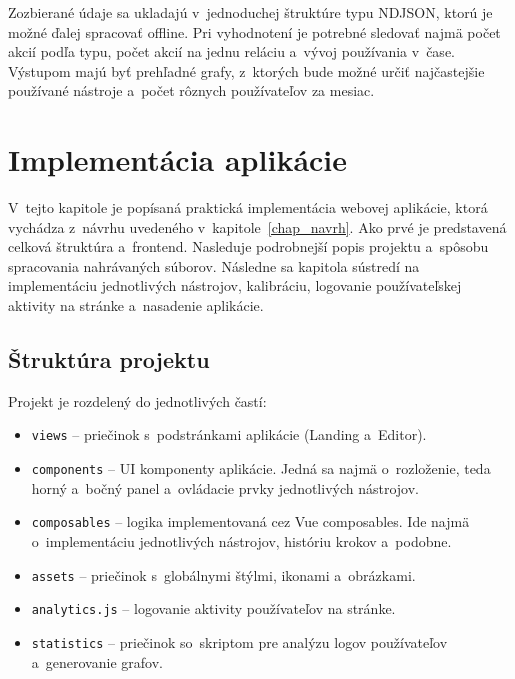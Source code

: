 Zozbierané údaje sa ukladajú v~jednoduchej štruktúre typu NDJSON, ktorú je možné ďalej spracovať offline. Pri vyhodnotení je potrebné sledovať najmä počet akcií podľa typu, počet akcií na jednu reláciu a~vývoj používania v~čase. Výstupom majú byť prehľadné grafy, z~ktorých bude možné určiť najčastejšie používané nástroje a~počet rôznych používateľov za mesiac.

\chapter{Implementácia aplikácie}
\label{chap_implementacia}

V~tejto kapitole je popísaná praktická implementácia webovej aplikácie, ktorá vychádza z~návrhu uvedeného v~kapitole~\ref{chap_navrh}. Ako prvé je predstavená celková štruktúra a~frontend. Nasleduje podrobnejší popis projektu a~spôsobu spracovania nahrávaných súborov. Následne sa kapitola sústredí na implementáciu jednotlivých nástrojov, kalibráciu, logovanie používateľskej aktivity na stránke a~nasadenie aplikácie. 

\section{Štruktúra projektu}

Projekt je rozdelený do jednotlivých častí:
\begin{itemize}
    \item{\texttt{views} -- priečinok s~podstránkami aplikácie (Landing a~Editor).}
    \item{\texttt{components} -- UI komponenty aplikácie. Jedná sa najmä o~rozloženie, teda horný a~bočný panel a~ovládacie prvky jednotlivých nástrojov.}
    \item{\texttt{composables} -- logika implementovaná cez Vue composables. Ide najmä o~implementáciu jednotlivých nástrojov, históriu krokov a~podobne.}
    \item{\texttt{assets} -- priečinok s~globálnymi štýlmi, ikonami a~obrázkami.}
    \item{\texttt{analytics.js} -- logovanie aktivity používateľov na stránke.}
    \item{\texttt{statistics} -- priečinok so~skriptom pre analýzu logov používateľov a~generovanie grafov.}
\end{itemize}

